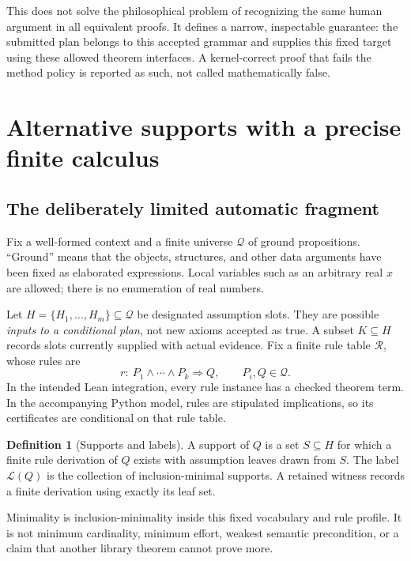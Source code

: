 \documentclass[11pt,a4paper]{article}
\newcommand{\Supp}{\mathcal L}\newcommand{\Front}{\mathcal F}
\numberwithin{equation}{section}
\theoremstyle{definition}\newtheorem{definition}[theorem]{Definition}
\theoremstyle{remark}\newtheorem{remark}[theorem]{Remark}
\begin{document}
This does not solve the philosophical problem of recognizing the same human
argument in all equivalent proofs. It defines a narrow, inspectable guarantee:
the submitted plan belongs to this accepted grammar and supplies this fixed
target using these allowed theorem interfaces. A kernel-correct proof that
fails the method policy is reported as such, not called mathematically false.

\section{Alternative supports with a precise finite calculus}\label{sec:supports}

\subsection{The deliberately limited automatic fragment}
Fix a well-formed context and a finite universe \(\mathcal Q\) of ground
propositions. ``Ground'' means that the objects, structures, and other data
arguments have been fixed as elaborated expressions. Local variables such as
an arbitrary real \(x\) are allowed; there is no enumeration of real numbers.

Let \(H=\{H_1,\ldots,H_m\}\subseteq\mathcal Q\) be designated assumption
slots. They are possible \emph{inputs to a conditional plan}, not new axioms
accepted as true. A subset \(K\subseteq H\) records slots currently supplied
with actual evidence. Fix a finite rule table \(\mathcal R\), whose rules are
\[
 r:\ P_1\land\cdots\land P_k\Longrightarrow Q,
 \qquad P_i,Q\in\mathcal Q.
\]
In the intended Lean integration, every rule instance has a checked theorem
term. In the accompanying Python model, rules are stipulated implications,
so its certificates are conditional on that rule table.

\begin{definition}[Supports and labels]
A support of \(Q\) is a set \(S\subseteq H\) for which a finite rule derivation
of \(Q\) exists with assumption leaves drawn from \(S\).
The label \(\Supp(Q)\) is the collection of inclusion-minimal supports.
A retained witness records a finite derivation using exactly its leaf set.
\end{definition}

Minimality is inclusion-minimality inside this fixed vocabulary and rule
profile. It is not minimum cardinality, minimum effort, weakest semantic
precondition, or a claim that another library theorem cannot prove more.
\end{document}
